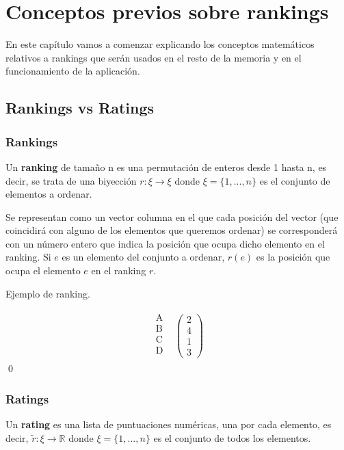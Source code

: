 \chapter{Conceptos previos sobre rankings}
En este capítulo vamos a comenzar explicando los conceptos matemáticos relativos a rankings que serán usados en el resto de la memoria y en el funcionamiento de la aplicación.

\section{Rankings vs Ratings}

\subsection*{Rankings}
\begin{defi} 
	Un \textbf{ranking} de tamaño n es una permutación de enteros desde 1 hasta n, es decir, se trata de una biyección $r: \xi \rightarrow \xi$ donde $\xi = \{1,...,n\}$ es el conjunto de elementos a ordenar.
\end{defi}

Se representan como un vector columna en el que cada posición del vector (que coincidirá con alguno de los elementos que queremos ordenar) se corresponderá con un número entero que indica la posición que ocupa dicho elemento en el ranking.  Si $e$ es un elemento del conjunto a ordenar, $r(e)$ es la posición que ocupa el elemento $e$ en el ranking $r$.\\
 
\begin{ejem} \label{ejem1}
Ejemplo de ranking.
\end{ejem}
\[
\begin{array}{ccc}
\begin{array}{c}
\text{A}\\
\text{B} \\
\text{C} \\
\text{D} \\
\end{array} & \left(\begin{array}{c}
2\\
4\\
1\\
3
\end{array} \right)
\end{array}  
\]
\qed

\subsection*{Ratings}
\begin{defi} 
	Un \textbf{rating} es una lista de puntuaciones numéricas, una por cada elemento, es decir, $\tilde{r}: \xi \rightarrow \mathbb{R}$ donde $\xi = \{1,...,n\}$ es el conjunto de todos los elementos.
\end{defi}

